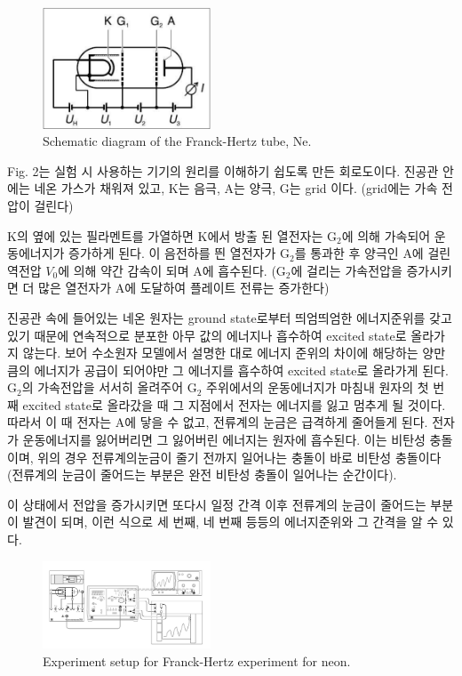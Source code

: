 \documentclass[a4paper, 10pt, nanum]{CSUniSchoolLabReport}
\begin{document}
	\begin{figure}[htb!]
		\centering
		\includegraphics[width=5cm]{fig2.png}
		\caption{Schematic diagram of the Franck-Hertz tube, Ne.}
		\label{fig:2}
	\end{figure}

	Fig. 2는 실험 시 사용하는 기기의 원리를 이해하기 쉽도록 만든 회로도이다. 진공관 안에는 네온 가스가 채워져 있고, K는 음극, A는 양극, G는 grid 이다. (grid에는 가속 전압이 걸린다)

	K의 옆에 있는 필라멘트를 가열하면 K에서 방출 된 열전자는 G$_2$에 의해 가속되어 운동에너지가 증가하게 된다. 이 음전하를 띈 열전자가 G$_2$를 통과한 후 양극인 A에 걸린 역전압 $V_0$에 의해 약간 감속이 되며 A에 흡수된다. (G$_2$에 걸리는 가속전압을 증가시키면 더 많은 열전자가 A에 도달하여 플레이트 전류는 증가한다)

	진공관 속에 들어있는 네온 원자는 ground state로부터 띄엄띄엄한 에너지준위를 갖고 있기 때문에 연속적으로 분포한 아무 값의 에너지나 흡수하여 excited state로 올라가지 않는다. 보어 수소원자 모델에서 설명한 대로 에너지 준위의 차이에 해당하는 양만큼의 에너지가 공급이 되어야만 그 에너지를 흡수하여 excited state로 올라가게 된다. G$_2$의 가속전압을 서서히 올려주어 G$_2$ 주위에서의 운동에너지가 마침내 원자의 첫 번째 excited state로 올라갔을 때 그 지점에서 전자는 에너지를 잃고 멈추게 될 것이다. 따라서 이 때 전자는 A에 닿을 수 없고, 전류계의 눈금은 급격하게 줄어들게 된다. 전자가 운동에너지를 잃어버리면 그 잃어버린 에너지는 원자에 흡수된다. 이는 비탄성 충돌이며, 위의 경우 전류계의눈금이 줄기 전까지 일어나는 충돌이 바로 비탄성 충돌이다(전류계의 눈금이 줄어드는 부분은 완전 비탄성 충돌이 일어나는 순간이다).

	이 상태에서 전압을 증가시키면 또다시 일정 간격 이후 전류계의 눈금이 줄어드는 부분이 발견이 되며, 이런 식으로 세 번째, 네 번째 등등의 에너지준위와 그 간격을 알 수 있다.

	\begin{figure}[htb!]
		\centering
		\includegraphics[width=5cm]{fig3.png}
		\caption{Experiment setup for Franck-Hertz experiment for neon.}
		\label{fig:3}
	\end{figure}
\end{document}
